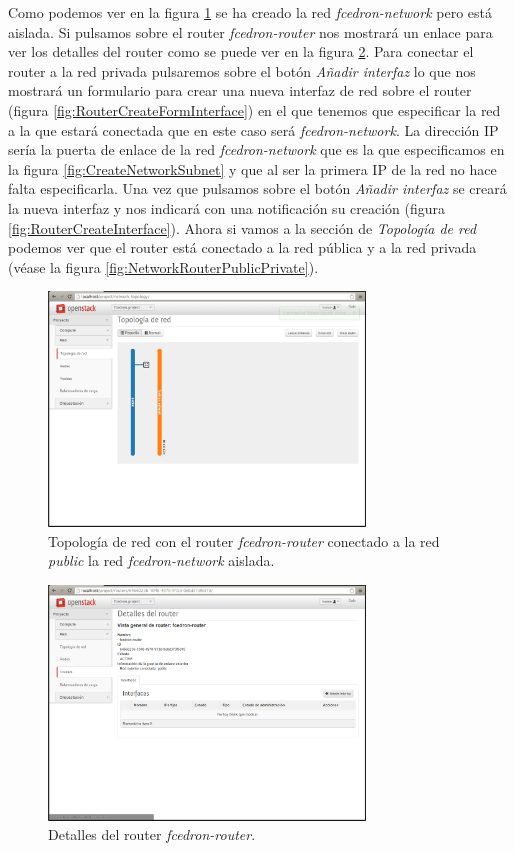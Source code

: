 \documentclass{article}
\begin{document}
	Como podemos ver en la figura \ref{fig:NetworkRouterPublicAndPrivate} se ha creado la red \emph{fcedron-network} pero está aislada. Si pulsamos sobre el router \emph{fcedron-router} nos mostrará un enlace para ver los detalles del router como se puede ver en la figura \ref{fig:RouterDetails}. Para conectar el router a la red privada pulsaremos sobre el botón \emph{Añadir interfaz} lo que nos mostrará un formulario para crear una nueva interfaz de red sobre el router (figura \ref{fig:RouterCreateFormInterface}) en el que tenemos que especificar la red a la que estará conectada que en este caso será \emph{fcedron-network}. La dirección IP sería la puerta de enlace de la red \emph{fcedron-network} que es la que especificamos en la figura \ref{fig:CreateNetworkSubnet} y que al ser la primera IP de la red no hace falta especificarla. Una vez que pulsamos sobre el botón \emph{Añadir interfaz} se creará la nueva interfaz y nos indicará con una notificación su creación (figura \ref{fig:RouterCreateInterface}). Ahora si vamos a la sección de \emph{Topología de red} podemos ver que el router está conectado a la red pública y a la red privada (véase la figura \ref{fig:NetworkRouterPublicPrivate}).

\begin{figure}[h]
  \centering
    \includegraphics[width=0.75\textwidth]{img/m_021.png}
  \caption{Topología de red con el router \emph{fcedron-router} conectado a la red \emph{public} la red \emph{fcedron-network} aislada.}
  \label{fig:NetworkRouterPublicAndPrivate}
\end{figure}	

\begin{figure}[h]
  \centering
    \includegraphics[width=0.75\textwidth]{img/m_023.png}
  \caption{Detalles del router \emph{fcedron-router}.}
  \label{fig:RouterDetails}
\end{figure}	
\end{document}
